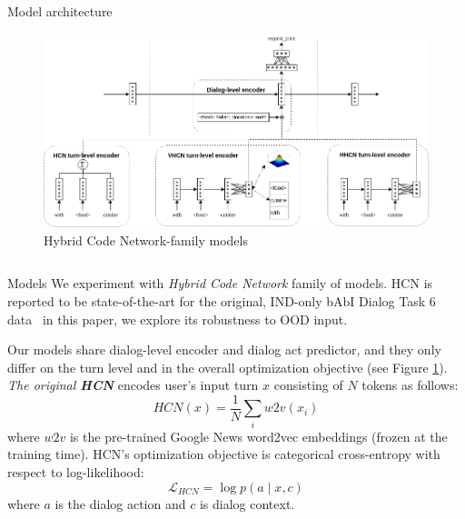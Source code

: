 \documentclass[final]{beamer}
\newlength{\colwidth}
\newlength{\doublecolwidth}
\begin{document}
\begin{frame}[t]
\begin{columns}[t]
\begin{column}{\doublecolwidth}
\begin{block}{Model architecture}
\begin{figure}
\centering
\includegraphics[scale=1.2]{img/hcn_all.png}
\caption{Hybrid Code Network-family models}
\label{fig:hcn_all}
\end{figure}
\end{block}

\begin{columns}[t,totalwidth=\doublecolwidth]

\begin{column}{\colwidth}
\begin{block}{Models}
We experiment with \textit{Hybrid Code Network} family of models. HCN is reported to be state-of-the-art for the original, IND-only bAbI Dialog Task 6 data~\textemdash{} in this paper, we explore its robustness to OOD input.


Our models share dialog-level encoder and dialog act predictor, and they only differ on the turn level and in the overall optimization objective (see Figure \ref{fig:hcn_all}).
\textit{The original \textbf{HCN}} encodes user's input turn $x$ consisting of $N$ tokens as follows:
\begin{equation} \label{eq:w2v}
HCN(x) = \frac{1}{N} \sum_i{w2v(x_i)}
\end{equation} where $w2v$ is the pre-trained Google News word2vec embeddings (frozen at the training time). HCN's optimization objective is categorical cross-entropy with respect to log-likelihood:
\begin{equation} \label{eq:l_hcn}
\mathcal{L}_{HCN} = \log p(a \mid x, c)
\end{equation} where $a$ is the dialog action and $c$ is dialog context.


\end{block}
\end{column}
\end{columns}
\end{column}
\end{columns}
\end{frame}
\end{document}
